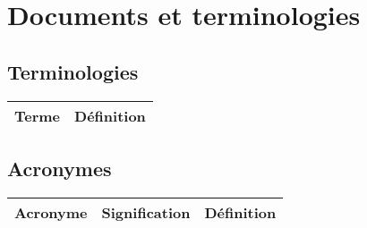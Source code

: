 \chapter{Documents et terminologies}


\section{Terminologies}

\begin{tabular}{|r|l|}
   	\hline
   	Terme & Définition \\
	\hline
\end{tabular}

\section{Acronymes}

\begin{tabular}{|r|l|l|}
	\hline
	Acronyme & Signification & Définition \\
	\hline
\end{tabular}